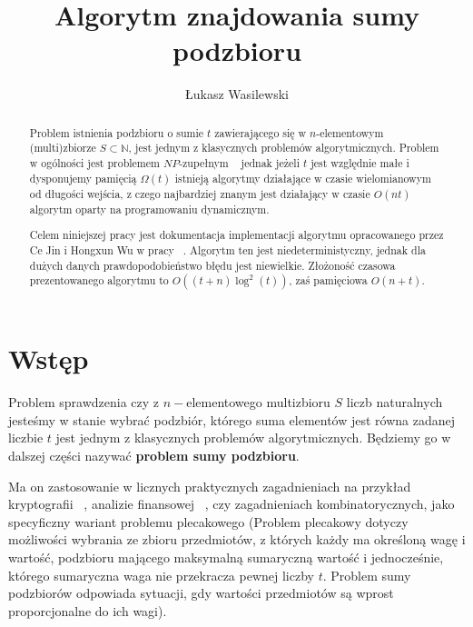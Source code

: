 \documentclass{article}
\title{Algorytm znajdowania sumy podzbioru}
\author{Łukasz Wasilewski}
\begin{document}
\maketitle

\begin{abstract}
Problem istnienia podzbioru o sumie $t$ zawierającego się w $n$-elementowym (multi)zbiorze $S \subset \mathbb{N}$, 
jest jednym z klasycznych problemów algorytmicznych. Problem w ogólności jest problemem $NP$-zupełnym ~\cite{agarwal2011encrypting}
jednak jeżeli $t$ jest względnie małe i dysponujemy pamięcią $\Omega(t)$ istnieją algorytmy działające 
w czasie wielomianowym od długości wejścia, z czego najbardziej znanym jest działający w czasie $O(nt)$ 
algorytm oparty na programowaniu dynamicznym.

Celem niniejszej pracy jest dokumentacja implementacji
algorytmu opracowanego przez Ce Jin i Hongxun Wu w pracy ~\cite{jin2018simple}. Algorytm ten jest niedeterministyczny,
jednak dla dużych danych prawdopodobieństwo błędu jest niewielkie. Złożoność czasowa prezentowanego
algorytmu to $O((t+n)\log^2(t))$, zaś pamięciowa $O(n+t)$.

\end{abstract}

\section{Wstęp}
Problem sprawdzenia czy z $n-$elementowego multizbioru $S$ liczb naturalnych jesteśmy w stanie wybrać 
podzbiór, którego suma elementów jest równa zadanej liczbie $t$ jest jednym z klasycznych problemów 
algorytmicznych. Będziemy go w dalszej części nazywać \textbf{problem sumy podzbioru}. 

Ma on zastosowanie w licznych praktycznych zagadnieniach na przykład kryptografii
~\cite{agarwal2011encrypting}, analizie finansowej 
~\cite{biesner2022solving}, czy zagadnieniach kombinatorycznych, jako specyficzny
wariant problemu plecakowego (Problem plecakowy dotyczy możliwości wybrania ze zbioru przedmiotów, z których każdy ma 
określoną wagę i wartość, podzbioru mającego maksymalną sumaryczną wartość i jednocześnie, którego 
sumaryczna waga nie przekracza pewnej liczby $t$. Problem sumy podzbiorów odpowiada sytuacji, 
gdy wartości przedmiotów są wprost proporcjonalne do ich wagi). 
\end{document}
